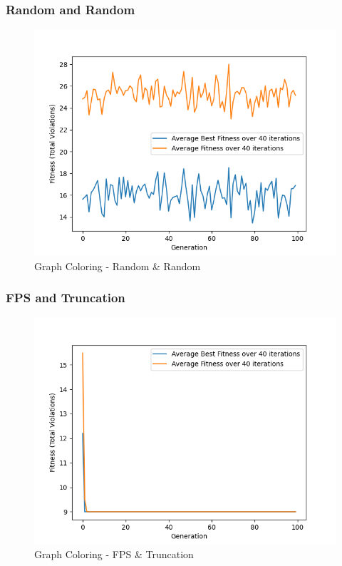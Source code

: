 \documentclass[11pt, letterpaper]{article}
\begin{document}
\subsubsection {Random and Random}
\begin{figure}[H]
    \centering
    \includegraphics[scale = 0.6]{images/graphcoloring_rd_rd.png}
    \caption {Graph Coloring - Random \& Random}
    \label {fig:gcRR}
\end{figure}

\subsubsection {FPS and Truncation}
\begin{figure}[H]
    \centering
    \includegraphics[scale = 0.6]{images/graphcoloring_fp_tr.png}
    \caption {Graph Coloring - FPS \& Truncation}
    \label {fig:gcFT}
\end{figure}
\end{document}
